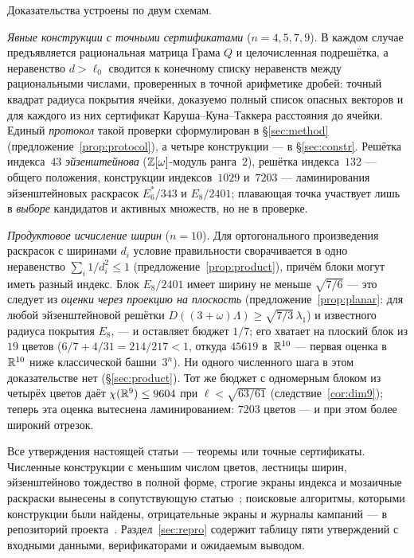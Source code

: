Доказательства устроены по двум схемам.

\emph{Явные конструкции с точными сертификатами} ($n=4,5,7,9$). В каждом случае
предъявляется рациональная матрица Грама $Q$ и целочисленная подрешётка, а
неравенство $d>\ell_0$ сводится к конечному списку неравенств между
рациональными числами, проверенных в точной арифметике дробей: точный
квадрат радиуса покрытия ячейки, доказуемо полный список опасных векторов и
для каждого из них сертификат Каруша--Куна--Таккера расстояния до ячейки.
Единый \emph{протокол} такой проверки сформулирован в \S\ref{sec:method}
(предложение~\ref{prop:protocol}), а четыре конструкции --- в
\S\ref{sec:constr}. Решётка индекса~$43$ \emph{эйзенштейнова}
($\mathbb{Z}[\omega]$-модуль ранга~$2$), решётка индекса~$132$ --- общего положения,
конструкции индексов~$1029$ и~$7203$ --- ламинирования эйзенштейновых
раскрасок $E_6^*/343$ и $E_8/2401$; плавающая точка участвует лишь в
\emph{выборе} кандидатов и активных множеств, но не в проверке.

\emph{Продуктовое исчисление ширин} ($n=10$). Для ортогонального
произведения раскрасок с ширинами $d_i$ условие правильности сворачивается в
одно неравенство $\sum_i1/d_i^2\le1$ (предложение~\ref{prop:product}), причём
блоки могут иметь разный индекс. Блок $E_8/2401$ имеет ширину не меньше
$\sqrt{7/6}$ --- это следует из \emph{оценки через проекцию на плоскость}
(предложение~\ref{prop:planar}: для любой эйзенштейновой решётки
$D((3+\omega)\Lambda)\ge\sqrt{7/3}\,\lambda_1$) и известного радиуса покрытия
$E_8$, --- и оставляет бюджет $1/7$; его хватает на плоский блок из
$19$ цветов ($6/7+4/31=214/217<1$, откуда $45619$ в~$\mathbb{R}^{10}$ --- первая
оценка в $\mathbb{R}^{10}$ ниже классической башни~$3^n$). Ни одного численного шага
в этом доказательстве нет (\S\ref{sec:product}). Тот же бюджет с одномерным
блоком из четырёх цветов даёт $\chi(\mathbb{R}^9)\le9604$ при
$\ell<\sqrt{63/61}$ (следствие~\ref{cor:dim9}); теперь эта оценка вытеснена
ламинированием: $7203$ цветов --- и при этом более широкий отрезок.

Все утверждения настоящей статьи --- теоремы или точные сертификаты.
Численные конструкции с меньшим числом цветов, лестницы ширин, эйзенштейново
тождество в полной форме, строгие экраны индекса и мозаичные раскраски вынесены
в сопутствующую статью~\cite{Widths}; поисковые алгоритмы, которыми конструкции
были найдены, отрицательные экраны и журналы кампаний --- в репозиторий
проекта~\cite{Repo}. Раздел~\ref{sec:repro} содержит таблицу пяти утверждений с
входными данными, верификаторами и ожидаемым выводом.
